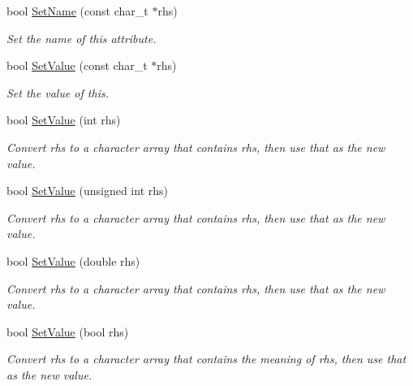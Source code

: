 \begin{DoxyCompactItemize}
bool \hyperlink{classphys_1_1xml_1_1Attribute_af669654308122897f98858563375bf4c}{SetName} (const char\_\-t $\ast$rhs)
\begin{DoxyCompactList}\small\item\em Set the name of this attribute. \item\end{DoxyCompactList}\item 
bool \hyperlink{classphys_1_1xml_1_1Attribute_a470512fcd8b4f7609319bf85df100aaa}{SetValue} (const char\_\-t $\ast$rhs)
\begin{DoxyCompactList}\small\item\em Set the value of this. \item\end{DoxyCompactList}\item 
bool \hyperlink{classphys_1_1xml_1_1Attribute_a693f7bd8015866c3c4979101c343ce50}{SetValue} (int rhs)
\begin{DoxyCompactList}\small\item\em Convert rhs to a character array that contains rhs, then use that as the new value. \item\end{DoxyCompactList}\item 
bool \hyperlink{classphys_1_1xml_1_1Attribute_a289ac36b218f3912224fd904ccade1ed}{SetValue} (unsigned int rhs)
\begin{DoxyCompactList}\small\item\em Convert rhs to a character array that contains rhs, then use that as the new value. \item\end{DoxyCompactList}\item 
bool \hyperlink{classphys_1_1xml_1_1Attribute_a919034671f61ee408d616409a49dafca}{SetValue} (double rhs)
\begin{DoxyCompactList}\small\item\em Convert rhs to a character array that contains rhs, then use that as the new value. \item\end{DoxyCompactList}\item 
bool \hyperlink{classphys_1_1xml_1_1Attribute_a6df4cf0f083482e69e4e6e94599a1d82}{SetValue} (bool rhs)
\begin{DoxyCompactList}\small\item\em Convert rhs to a character array that contains the meaning of rhs, then use that as the new value. \item\end{DoxyCompactList}\item 

\end{DoxyCompactItemize}
